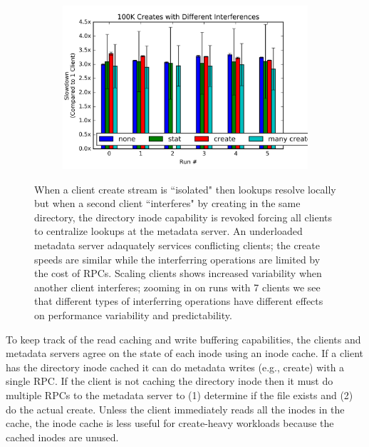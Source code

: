 \begin{figure}[t]
\begin{subfigure}[b]{.3\linewidth}
      \caption{}
      \label{fig:batching}
  \end{subfigure}
  \begin{subfigure}[b]{.3\linewidth}
      \centering
      \includegraphics[width=1.0\linewidth]{graphs/slowdown-interfere-types.png}
      \caption{}
      \label{fig:batching-outlier}
  \end{subfigure}
  \caption{When a client create stream is ``isolated" then lookups resolve
  locally but when a second client ``interferes" by creating in the same
  directory, the directory inode capability is revoked forcing all clients to
  centralize lookups at the metadata server.  An underloaded metadata server
  adaquately services conflicting clients; the create speeds are similar while
  the interferring operations are limited by the cost of RPCs.  Scaling clients
  shows increased variability when another client interferes; zooming in on runs
  with 7 clients we see that different types of interferring operations have
  different effects on performance variability and predictability.
  \label{fig:throughput-droplease}}
\end{figure}

To keep track of the read caching and write buffering capabilities, the clients
and metadata servers agree on the state of each inode using an inode cache.  If
a client has the directory inode cached it can do metadata writes (e.g.,
create) with a single RPC. If the client is not caching the directory inode
then it must do multiple RPCs to the metadata server to (1) determine if the
file exists and (2) do the actual create.  Unless the client immediately reads
all the inodes in the cache, the inode cache is less useful for create-heavy
workloads because the cached inodes are unused. 

